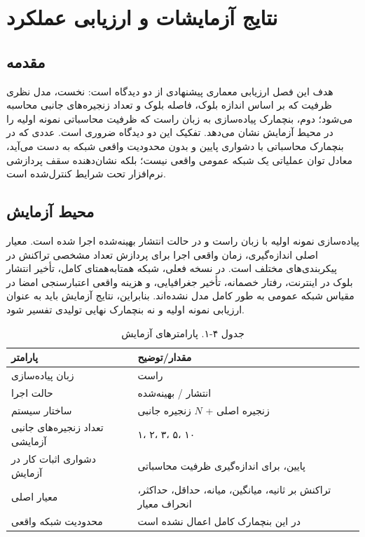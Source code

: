 \chapter{نتایج آزمایشات و ارزیابی عملکرد}
\section{مقدمه}

هدف این فصل ارزیابی معماری پیشنهادی از دو دیدگاه است: نخست، مدل نظری ظرفیت که بر اساس اندازه بلوک، فاصله بلوک و تعداد زنجیره‌های جانبی محاسبه می‌شود؛ دوم، بنچمارک پیاده‌سازی به زبان راست که ظرفیت محاسباتی نمونه اولیه را در محیط آزمایش نشان می‌دهد. تفکیک این دو دیدگاه ضروری است. عددی که در بنچمارک محاسباتی با دشواری پایین و بدون محدودیت واقعی شبکه به دست می‌آید، معادل توان عملیاتی یک شبکه عمومی واقعی نیست؛ بلکه نشان‌دهنده سقف پردازشی نرم‌افزار تحت شرایط کنترل‌شده است.

\section{محیط آزمایش}

پیاده‌سازی نمونه اولیه با زبان راست و در حالت انتشار بهینه‌شده اجرا شده است. معیار اصلی اندازه‌گیری، زمان واقعی اجرا برای پردازش تعداد مشخصی تراکنش در پیکربندی‌های مختلف است. در نسخه فعلی، شبکه همتا‌به‌همتای کامل، تأخیر انتشار بلوک در اینترنت، رفتار خصمانه، تأخیر جغرافیایی، و هزینه واقعی اعتبارسنجی امضا در مقیاس شبکه عمومی به طور کامل مدل نشده‌اند. بنابراین، نتایج آزمایش باید به عنوان ارزیابی نمونه اولیه و نه بنچمارک نهایی تولیدی تفسیر شود.

\begin{table}[h]
\centering
\caption{جدول ۴-۱. پارامترهای آزمایش}
\small
\begin{tabular}{|p{5.5cm}|p{8cm}|}
\hline
پارامتر & مقدار/توضیح \\
\hline
زبان پیاده‌سازی & راست \\
\hline
حالت اجرا & انتشار / بهینه‌شده \\
\hline
ساختار سیستم & زنجیره اصلی + \(N\) زنجیره جانبی \\
\hline
تعداد زنجیره‌های جانبی آزمایشی & ۱، ۲، ۳، ۵، ۱۰ \\
\hline
دشواری اثبات کار در آزمایش & پایین، برای اندازه‌گیری ظرفیت محاسباتی \\
\hline
معیار اصلی & تراکنش بر ثانیه، میانگین، میانه، حداقل، حداکثر، انحراف معیار \\
\hline
محدودیت شبکه واقعی & در این بنچمارک کامل اعمال نشده است \\
\hline
\end{tabular}
\end{table}

